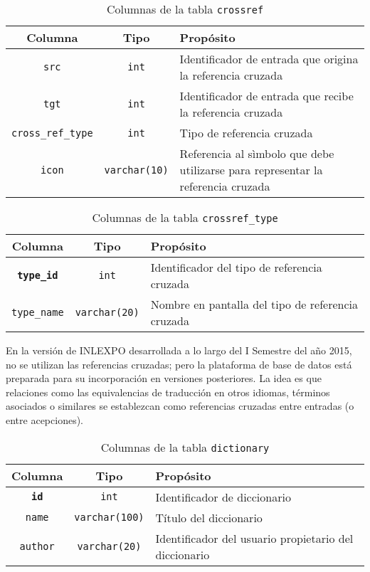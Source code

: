 \documentclass[11pt]{article} %
\begin{document}
\begin{table}
\centering
\begin{tabular}{ccp{6cm}} 
\toprule 
Columna & Tipo &Propósito \\ \midrule 
\texttt{src} &\texttt{int} & Identificador de  entrada que origina la referencia cruzada \\ 
\texttt{tgt} &\texttt{int} & Identificador de entrada que recibe la referencia cruzada \\ 
\texttt{cross\_ref\_type} &\texttt{int} & Tipo de referencia cruzada \\ 
\texttt{icon} &\texttt{varchar(10)} & Referencia al sìmbolo que debe utilizarse para representar la referencia cruzada \\ 
\bottomrule 
\end{tabular}
\caption{Columnas de la tabla \texttt{crossref}}
\end{table}

\begin{table}
\centering
\begin{tabular}{ccp{6cm}} 
\toprule 
Columna & Tipo &Propósito \\ \midrule 
\texttt{\bf type\_id} &\texttt{int} & Identificador del tipo de referencia cruzada \\ 
\texttt{type\_name} & \texttt{varchar(20)} & Nombre en pantalla del tipo de referencia cruzada \\ 
\bottomrule 
\end{tabular}
\caption{Columnas de la tabla \texttt{crossref\_type}}
\end{table}

En  la versión de INLEXPO desarrollada a lo largo del I Semestre del año 2015, no se utilizan las referencias cruzadas; pero la plataforma de base de datos está preparada para su incorporación en versiones posteriores. La idea es que relaciones como las equivalencias de traducción en otros idiomas, términos  asociados o similares se establezcan como referencias cruzadas entre entradas (o entre acepciones). 

\begin{table}
\centering
\begin{tabular}{ccp{6cm}} 
\toprule 
Columna & Tipo &Propósito \\ \midrule 
\texttt{\bf id} &\texttt{int} & Identificador de diccionario \\ 
\texttt{name} &\texttt{varchar(100)} &  Título del diccionario\\ 
\texttt{author} & \texttt{varchar(20)} & Identificador del usuario propietario del diccionario\\ 
\bottomrule 
\end{tabular}
\caption{Columnas de la tabla \texttt{dictionary}}
\end{table}
\end{document}
